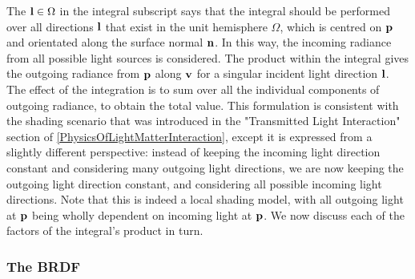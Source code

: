 The \begin{math}\mathbf{l}\in\Omega\end{math} in the integral subscript says that the integral should be performed over all directions \begin{math}\mathbf{l}\end{math} that exist in the unit hemisphere \begin{math}\Omega\end{math}, which is centred on \begin{math}\mathbf{p}\end{math} and orientated along the surface normal \begin{math}\mathbf{n}\end{math}. In this way, the incoming radiance from all possible light sources is considered. The product within the integral gives the outgoing radiance from \begin{math}\mathbf{p}\end{math} along \begin{math}\mathbf{v}\end{math} for a singular incident light direction \begin{math}\mathbf{l}\end{math}. The effect of the integration is to sum over all the individual components of outgoing radiance, to obtain the total value. This formulation is consistent with the shading scenario that was introduced in the "Transmitted Light Interaction" section of \ref{PhysicsOfLightMatterInteraction}, except it is expressed from a slightly different perspective: instead of keeping the incoming light direction constant and considering many outgoing light directions, we are now keeping the outgoing light direction constant, and considering all possible incoming light directions. Note that this is indeed a local shading model, with all outgoing light at \begin{math}\mathbf{p}\end{math} being wholly dependent on incoming light at \begin{math}\mathbf{p}\end{math}. We now discuss each of the factors of the integral's product in turn.

\subsubsection{The BRDF}

